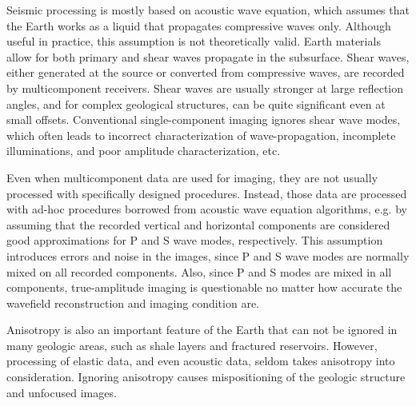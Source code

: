 
Seismic processing is mostly based on acoustic wave equation, which assumes that the Earth works as a liquid that propagates compressive waves only. Although useful in practice, this assumption is not theoretically valid.
Earth materials allow for both primary and shear waves propagate in the subsurface. Shear waves, either generated at the source or converted from compressive waves, are recorded by multicomponent receivers.  Shear waves are usually stronger at large reflection angles, and for complex geological structures, can be quite significant even at small offsets.
Conventional single-component imaging ignores shear wave modes, which often leads to incorrect characterization of wave-propagation, incomplete illuminations, and poor amplitude characterization, etc.


Even when multicomponent data are used for imaging, they are not usually processed with specifically designed procedures. Instead, those data are processed with ad-hoc procedures borrowed from acoustic wave equation algorithms, e.g. by assuming that the recorded vertical and horizontal components are considered good approximations for P and S wave modes, respectively. This assumption introduces errors and noise in the images, since P and S wave modes are normally mixed on all recorded components. Also, since P and S modes are mixed in all components, true-amplitude imaging is questionable no matter how accurate the wavefield reconstruction and imaging condition are.

Anisotropy is also an important feature of the Earth that can not be ignored in many geologic areas, such as shale layers and fractured reservoirs. However, processing of elastic data, and even acoustic data, seldom takes anisotropy into consideration. Ignoring anisotropy causes mispositioning of the geologic structure and unfocused images. 


